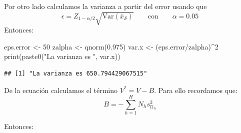 \documentclass[
]{book}
\newenvironment{Shaded}{\begin{snugshade}}{\end{snugshade}}
\newcommand{\AttributeTok}[1]{\textcolor[rgb]{0.77,0.63,0.00}{#1}}
\newcommand{\DecValTok}[1]{\textcolor[rgb]{0.00,0.00,0.81}{#1}}
\newcommand{\FloatTok}[1]{\textcolor[rgb]{0.00,0.00,0.81}{#1}}
\newcommand{\FunctionTok}[1]{\textcolor[rgb]{0.00,0.00,0.00}{#1}}
\newcommand{\NormalTok}[1]{#1}
\newcommand{\OtherTok}[1]{\textcolor[rgb]{0.56,0.35,0.01}{#1}}
\newcommand{\SpecialCharTok}[1]{\textcolor[rgb]{0.00,0.00,0.00}{#1}}
\newcommand{\StringTok}[1]{\textcolor[rgb]{0.31,0.60,0.02}{#1}}
\begin{document}
Por otro lado calculamos la varianza a partir del error usando que
\[
\epsilon = Z_{1 - \alpha/2}\sqrt{\textrm{Var}(\bar{x}_{\mathcal{S}})} \qquad \text{con} \qquad \alpha = 0.05
\]
Entonces:

\begin{Shaded}
\begin{Highlighting}[]
\NormalTok{eps.error }\OtherTok{\textless{}{-}} \DecValTok{50}
\NormalTok{zalpha    }\OtherTok{\textless{}{-}} \FunctionTok{qnorm}\NormalTok{(}\FloatTok{0.975}\NormalTok{)}
\NormalTok{var.x     }\OtherTok{\textless{}{-}}\NormalTok{ (eps.error}\SpecialCharTok{/}\NormalTok{zalpha)}\SpecialCharTok{\^{}}\DecValTok{2}
\FunctionTok{print}\NormalTok{(}\FunctionTok{paste0}\NormalTok{(}\StringTok{"La varianza es "}\NormalTok{, var.x))}
\end{Highlighting}
\end{Shaded}

\begin{verbatim}
## [1] "La varianza es 650.794429067515"
\end{verbatim}

De la ecuación calculamos el término \(V^* = V - B\). Para ello recordamos que:
\[
B = -\sum\limits_{h = 1}^H N_h s^2_{\mathcal{U}_h}
\]

Entonces:

\begin{Shaded}
\end{Shaded}
\end{document}
